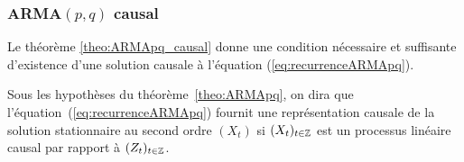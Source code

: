 \subsubsection{ARMA$(p,q)$ causal}
Le th\'eor\`eme \ref{theo:ARMApq_causal} donne une condition n\'ecessaire
et suffisante d'existence d'une solution causale \`a l'\'equation
(\ref{eq:recurrenceARMApq}).

\begin{definition}
  Sous les hypoth\`eses du th\'eor\`eme~\ref{theo:ARMApq}, on dira que
  l'\'equation~(\ref{eq:recurrenceARMApq}) fournit une repr\'esentation causale de
  la solution stationnaire au second ordre $(X_t)$ si $(X_t)_{t\in\mathbb{Z}}$ est
  un processus lin\'eaire causal par rapport \`a $(Z_t)_{t\in\mathbb{Z}}$.
\end{definition}

